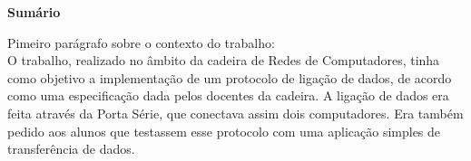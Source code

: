 \documentclass[a4paper]{article}
\begin{document}
\maketitle
\thispagestyle{empty}


\newpage

%
%
%
%
%
%
%

\Huge\textbf{Sumário}\linebreak\linebreak
\normalsize 

Pimeiro parágrafo sobre o contexto do trabalho:\\
O trabalho, realizado no âmbito da cadeira de Redes de Computadores, tinha como objetivo a implementação de um protocolo de ligação de dados, de acordo como uma especificação dada pelos docentes da cadeira. A ligação de dados era feita através da Porta Série, que conectava assim dois computadores.
Era também pedido aos alunos que testassem esse protocolo com uma aplicação simples de transferência de dados.
\end{document}
